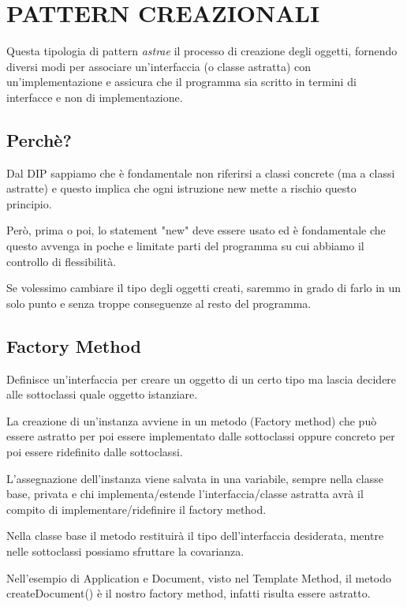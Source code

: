 \chapter{PATTERN CREAZIONALI}

Questa tipologia di pattern \textit{astrae} il processo di creazione degli oggetti, fornendo diversi modi per associare un’interfaccia (o classe astratta) con 
un’implementazione e assicura che il programma sia scritto in termini di interfacce e non di implementazione.

\section{Perchè?}

Dal DIP sappiamo che è fondamentale non riferirsi a classi concrete (ma a classi astratte) e questo implica che ogni istruzione new mette a rischio questo principio.

Però, prima o poi, lo statement "new" deve essere usato ed è fondamentale che questo avvenga in poche e limitate parti del programma su cui abbiamo il controllo di 
flessibilità.

Se volessimo cambiare il tipo degli oggetti creati, saremmo in grado di farlo in un solo punto e senza troppe conseguenze al resto del programma.

\section{Factory Method}

Definisce un’interfaccia per creare un oggetto di un certo tipo ma lascia decidere alle sottoclassi quale oggetto istanziare.

La creazione di un'instanza avviene in un metodo (Factory method) che può essere astratto per poi essere implementato dalle sottoclassi oppure concreto per poi 
essere ridefinito dalle sottoclassi.

L'assegnazione dell'instanza viene salvata in una variabile, sempre nella classe base, privata e chi implementa/estende l'interfaccia/classe astratta avrà il compito 
di implementare/ridefinire il factory method.

Nella classe base il metodo restituirà il tipo dell'interfaccia desiderata, mentre nelle sottoclassi possiamo sfruttare la covarianza.

Nell'esempio di Application e Document, visto nel Template Method, il metodo createDocument() è il nostro factory method, infatti risulta essere astratto.

